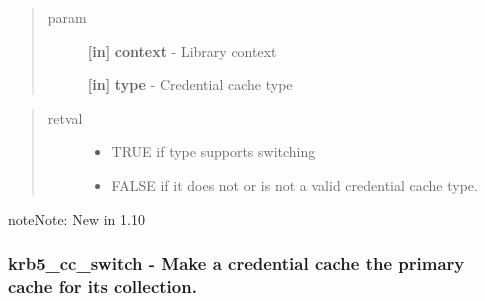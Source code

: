\documentclass[letterpaper,10pt,english]{sphinxmanual}
\begin{document}
\begin{quote}\begin{description}
\item[{param}] \leavevmode
\textbf{{[}in{]}} \textbf{context} - Library context

\textbf{{[}in{]}} \textbf{type} - Credential cache type

\end{description}\end{quote}
\begin{quote}\begin{description}
\item[{retval}] \leavevmode\begin{itemize}
\item {} 
TRUE   if type supports switching

\item {} 
FALSE   if it does not or is not a valid credential cache type.

\end{itemize}

\end{description}\end{quote}

\begin{notice}{note}{Note:}
New in 1.10
\end{notice}


\subsubsection{krb5\_cc\_switch -  Make a credential cache the primary cache for its collection.}
\label{appdev/refs/api/krb5_cc_switch::doc}\label{appdev/refs/api/krb5_cc_switch:krb5-cc-switch-make-a-credential-cache-the-primary-cache-for-its-collection}

\begin{fulllineitems}
\label{appdev/refs/api/krb5_cc_switch:krb5_cc_switch}
\end{fulllineitems}
\end{document}
